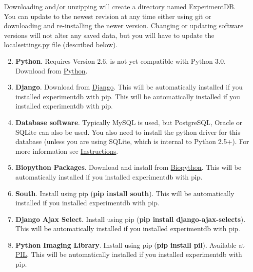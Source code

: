 \documentclass[letterpaper,10pt,english]{sphinxmanual}
\begin{document}
Downloading and/or unzipping will create a directory named ExperimentDB.  You can update to the newest revision at any time either using git or downloading and re-installing the newer version.  Changing or updating software versions will not alter any saved data, but you will have to update the localsettings.py file (described below).
\begin{enumerate}
\setcounter{enumi}{1}
\item {} 
\textbf{Python}.  Requires Version 2.6, is not yet compatible with Python 3.0.  Download from \href{http://www.python.org/download}{Python}.

\item {} 
\textbf{Django}.  Download from \href{http://www.djangoproject.com/download/}{Django}.  This will be automatically installed if you installed experimentdb with pip.  This will be automatically installed if you installed experimentdb with pip.

\item {} 
\textbf{Database software}.  Typically MySQL is used, but PostgreSQL, Oracle or SQLite can also be used.  You also need to install the python driver for this database (unless you are using SQLite, which is internal to Python 2.5+).  For more information see \href{http://docs.djangoproject.com/en/dev/topics/install/database-installation}{Instructions}.

\item {} 
\textbf{Biopython Packages}.  Download and install from \href{http://biopython.org}{Biopython}. This will be automatically installed if you installed experimentdb with pip.

\item {} 
\textbf{South}.  Install using pip (\textbf{pip install south}).  This will be automatically installed if you installed experimentdb with pip.

\item {} 
\textbf{Django Ajax Select}.  Install using pip (\textbf{pip install django-ajax-selects}).  This will be automatically installed if you installed experimentdb with pip.

\item {} 
\textbf{Python Imaging Library}.  Install using pip (\textbf{pip install pil}).  Available at \href{http://www.pythonware.com/products/pil/}{PIL}.  This will be automatically installed if you installed experimentdb with pip.

\end{enumerate}
\end{document}
